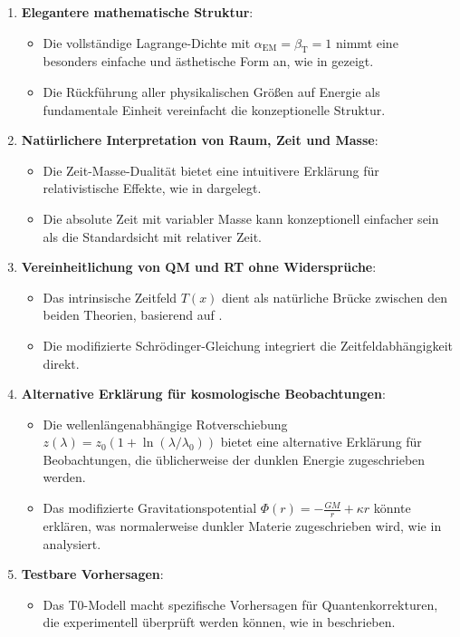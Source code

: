 \documentclass[12pt,a4paper]{article}
\newcommand{\Tfield}{T(x)}
\newcommand{\alphaEM}{\alpha_{\text{EM}}}
\newcommand{\betaT}{\beta_{\text{T}}}
\begin{document}
	\begin{enumerate}
		\item \textbf{Elegantere mathematische Struktur}:
		\begin{itemize}
			\item Die vollständige Lagrange-Dichte mit $\alphaEM = \betaT = 1$ nimmt eine besonders einfache und ästhetische Form an, wie in \cite{pascher_formalismen_2025} gezeigt.
			\item Die Rückführung aller physikalischen Größen auf Energie als fundamentale Einheit vereinfacht die konzeptionelle Struktur.
		\end{itemize}
		
		\item \textbf{Natürlichere Interpretation von Raum, Zeit und Masse}:
		\begin{itemize}
			\item Die Zeit-Masse-Dualität bietet eine intuitivere Erklärung für relativistische Effekte, wie in \cite{pascher_perspektive_2025} dargelegt.
			\item Die absolute Zeit mit variabler Masse kann konzeptionell einfacher sein als die Standardsicht mit relativer Zeit.
		\end{itemize}
		
		\item \textbf{Vereinheitlichung von QM und RT ohne Widersprüche}:
		\begin{itemize}
			\item Das intrinsische Zeitfeld $\Tfield$ dient als natürliche Brücke zwischen den beiden Theorien, basierend auf \cite{pascher_erweiterung_2025}.
			\item Die modifizierte Schrödinger-Gleichung integriert die Zeitfeldabhängigkeit direkt.
		\end{itemize}
		
		\item \textbf{Alternative Erklärung für kosmologische Beobachtungen}:
		\begin{itemize}
			\item Die wellenlängenabhängige Rotverschiebung $z(\lambda) = z_0(1 + \ln(\lambda/\lambda_0))$ bietet eine alternative Erklärung für Beobachtungen, die üblicherweise der dunklen Energie zugeschrieben werden.
			\item Das modifizierte Gravitationspotential $\Phi(r) = -\frac{GM}{r} + \kappa r$ könnte erklären, was normalerweise dunkler Materie zugeschrieben wird, wie in \cite{pascher_galaxies_2025} analysiert.
		\end{itemize}
		
		\item \textbf{Testbare Vorhersagen}:
		\begin{itemize}
			\item Das T0-Modell macht spezifische Vorhersagen für Quantenkorrekturen, die experimentell überprüft werden können, wie in \cite{pascher_params_2025} beschrieben.
		\end{itemize}
	\end{enumerate}
	
\end{document}
